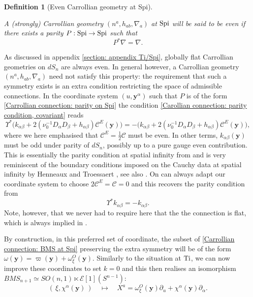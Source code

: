 \documentclass[a4paper, 10pt]{article}
\newtheorem{definition}{Definition}[section]
\theoremstyle{remark}
\newcommand{\Ti}{\textnormal{Ti}}
\newcommand{\Spi}{\textnormal{Spi}}
\newcommand{\y}{\bm{y}}
\begin{document}
\begin{definition}[Even Carrollian geometry at Spi]\label{Definition: Odd Carrollian geometry}\mbox{}

A (strongly) Carrollian geometry $(n^a, h_{ab}, \nabla_a)$ at $\Spi$ will be said to be even if there exists a parity $P : \Spi \to \Spi$ such that
\begin{equation}\label{Carollian connection: parity condition, covariant}
    P^* \nabla = \nabla.
\end{equation}   
\end{definition}
As discussed in appendix \ref{section: appendix Ti/Spi}, globally flat Carrollian geometries on $dS_{n}$ are always even. In general however, a Carrollian geometry $(n^a, h_{ab}, \nabla_a)$ need not satisfy this property: the requirement that such a symmetry exists is an extra condition restricting the space of admissible connections. In the coordinate system $(u,\y^{\alpha})$ such that $P$ is of the form \eqref{Carrollian connection: parity on Spi} the condition \eqref{Carollian connection: parity condition, covariant} reads
\begin{equation}
    \Upsilon^*\Big( k_{\alpha\beta} + 2(\nu_0^{-1}D_{\alpha}D_{\beta} + h_{\alpha\beta})\mathcal{C}^E(\y) \Big) = - \Big(k_{\alpha\beta}+ 2(\nu_0^{-1}D_{\alpha}D_{\beta} + h_{\alpha\beta})\mathcal{C}^E(\y)\Big), 
\end{equation} 
where we here emphasised that $\mathcal{C}^E = \frac{1}{2} \mathcal{C}$ must be even. In other terms, $k_{\alpha\beta}(\y)$ must be odd under parity of $dS_{n}$, possibly up to a pure gauge even contribution. This is essentially the parity condition at spatial infinity from \cite{Compere:2023qoa} and is very reminiscent of the boundary conditions imposed on the Cauchy data at spatial infinity by Henneaux and Troessaert \cite{Henneaux:2018cst,Henneaux:2019yax}, see also \cite{Mohamed:2021rfg,Mohamed:2023jwv,Mohamed:2023ttb}. On can always adapt our coordinate system to choose $2 \mathcal{C}^E =\mathcal{C}=0$  and this recovers the parity condition from \cite{Compere:2023qoa}
\begin{equation}
    \Upsilon^* k_{\alpha\beta}= -k_{\alpha\beta}.
\end{equation} 
Note, however, that we never had to require here that the the connection is flat, which is always implied in \cite{Compere:2023qoa}.

By construction, in this preferred set of coordinate, the subset of \eqref{Carrollian connection: BMS at Spi} preserving the extra symmetry will be of the form $\omega(\y) =  \varpi(\y)+ \omega^O_{\xi}(\y)$.  Similarly to the situation at $\Ti$, we can now improve these coordinates to set $k=0$ and this then realises an isomorphism $BMS_{n+1}\simeq SO(n,1) \ltimes  \mathcal{E}[1](S^{n-1}) $:
\begin{equation*}
   (\,\xi , \chi^{\alpha}(\y)\,)  \quad \mapsto \quad X^a =  \omega_{\xi}^O(\y) \partial_u + \chi^{\alpha}(\y) \partial_{\alpha}.
\end{equation*}
\end{document}
